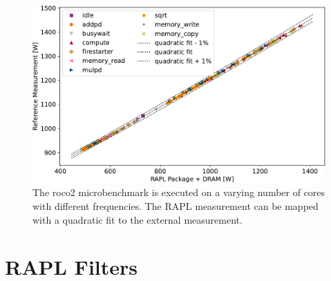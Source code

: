\begin{figure}[]
    \centering
    \includegraphics[width=0.8\columnwidth]{fig/rapl-validation.pdf}
    \caption{\label{fig:validate-rapl}The roco2 microbenchmark is executed on a varying number of cores with different frequencies.
    The RAPL measurement can be mapped with a quadratic fit to the external measurement.}
\end{figure}

\section{RAPL Filters}

